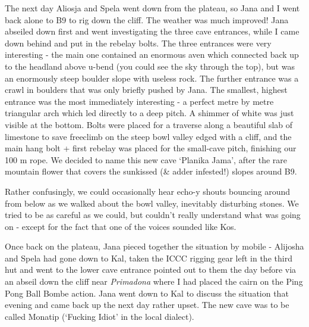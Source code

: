 The next day Aliosja and Spela went down from the plateau, so Jana and I
went back alone to B9 to rig down the cliff. The weather was much
improved! Jana abseiled down first and went investigating the three cave
entrances, while I came down behind and put in the rebelay bolts. The
three entrances were very interesting - the main one contained an
enormous aven which connected back up to the headland above u-bend (you
could see the sky through the top), but was an enormously steep boulder
slope with useless rock. The further entrance was a crawl in boulders
that was only briefly pushed by Jana. The smallest, highest entrance was
the most immediately interesting - a perfect metre by metre triangular
arch which led directly to a deep pitch. A shimmer of white was just
visible at the bottom. Bolts were placed for a traverse along a
beautiful slab of limestone to save freeclimb on the steep bowl valley
edged with a cliff, and the main hang bolt + first rebelay was placed
for the small-cave pitch, finishing our 100 m rope. We decided to name
this new cave `Planika Jama', after the rare mountain flower that covers
the sunkissed (\& adder infested!) slopes around B9.

Rather confusingly, we could occasionally hear echo-y shouts bouncing
around from below as we walked about the bowl valley, inevitably
disturbing stones. We tried to be as careful as we could, but couldn't
really understand what was going on - except for the fact that one of
the voices sounded like Kos.

Once back on the plateau, Jana pieced together the situation by mobile -
Alijosha and Spela had gone down to Kal, taken the ICCC rigging gear
left in the third hut and went to the lower cave entrance pointed out to
them the day before via an abseil down the cliff near \emph{Primadona}
where I had placed the cairn on the Ping Pong Ball Bombe action. Jana
went down to Kal to discuss the situation that evening and came back up
the next day rather upset. The new cave was to be called Monatip
(`Fucking Idiot' in the local dialect).

